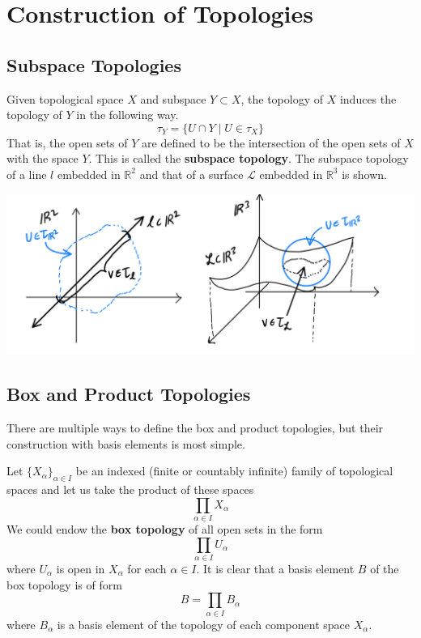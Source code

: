 \documentclass{article}
\begin{document}
\section{Construction of Topologies} 

  \subsection{Subspace Topologies} 

    \begin{definition}
    Given topological space $X$ and subspace $Y \subset X$, the topology of $X$ induces the topology of $Y$ in the following way. 
    \[\tau_Y = \{U \cap Y\;|\; U \in \tau_X\}\]
    That is, the open sets of $Y$ are defined to be the intersection of the open sets of $X$ with the space $Y$. This is called the \textbf{subspace topology}. The subspace topology of a line $l$ embedded in $\mathbb{R}^2$ and that of a surface $\mathcal{L}$ embedded in $\mathbb{R}^3$ is shown. 
    \begin{center}
        \includegraphics[scale=0.25]{img/Subspace_Topology.PNG}
    \end{center}
    \end{definition}

  \subsection{Box and Product Topologies} 

    There are multiple ways to define the box and product topologies, but their construction with basis elements is most simple. 

    \begin{definition}
    Let $\{X_\alpha\}_{\alpha \in I}$ be an indexed (finite or countably infinite) family of topological spaces and let us take the product of these spaces
    \[\prod_{\alpha \in I} X_\alpha\]
    We could endow the \textbf{box topology} of all open sets in the form
    \[\prod_{\alpha \in I} U_\alpha\]
    where $U_\alpha$ is open in $X_\alpha$ for each $\alpha \in I$. It is clear that a basis element $B$ of the box topology is of form
    \[B = \prod_{\alpha \in I} B_\alpha\]
    where $B_\alpha$ is a basis element of the topology of each component space $X_\alpha$. 
    \end{definition}
\end{document}
